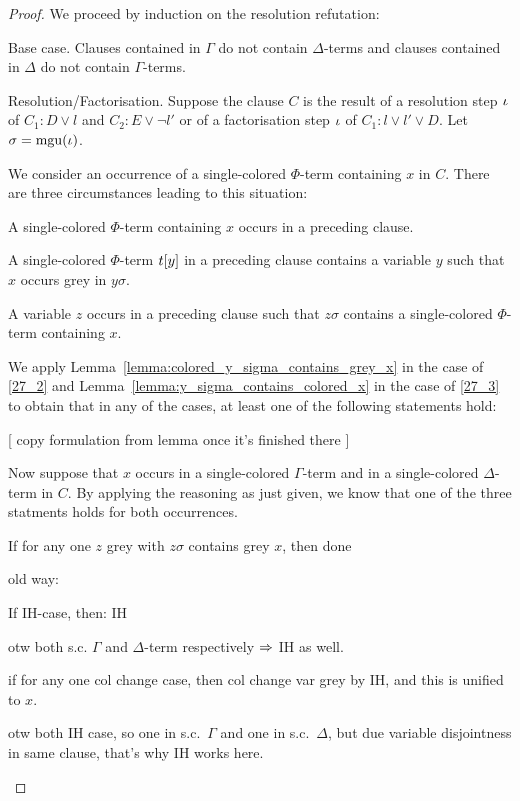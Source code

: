 \documentclass[,%
	draft=false,%
	numbers=noendperiod
	11pt,
	a4paper,
	oneside,%
	openany,
]{memoir}
\begin{document}
\begin{proof}
	We proceed by induction on the resolution refutation:

	\begin{description}
		\item{}Base case.
			Clauses contained in $\Gamma$ do not contain $\Delta$-terms and clauses contained in $\Delta$ do not contain $\Gamma$-terms.

		\item{}Resolution/Factorisation.
			Suppose the clause $C$ is the result of a resolution step $\iota$ of $C_1: D \lor l$ and $C_2: E \lor \lnot l'$
			or of a factorisation step $\iota$ of $C_1: l \lor l' \lor D$.
			Let $\sigma = \operatorname{mgu}(\iota)$. 


			We consider an occurrence of a single-colored $\Phi$-term containing $x$ in $C$.
			There are three circumstances leading to this situation:
			\begin{compactenum}
				\item A single-colored $\Phi$-term containing $x$ occurs in a preceding clause.
				\item A single-colored $\Phi$-term $t[y]$ in a preceding clause contains a variable $y$ such that $x$ occurs grey in $y\sigma$. \label{27_2}
				\item A variable $z$ occurs in a preceding clause such that $z\sigma$ contains a single-colored $\Phi$-term containing $x$. \label{27_3}
			\end{compactenum}

			We apply Lemma~\ref{lemma:colored_y_sigma_contains_grey_x} in the case of \ref{27_2} and
			Lemma~\ref{lemma:y_sigma_contains_colored_x} in the case of \ref{27_3} to obtain that in any of the cases, at least one of the following statements hold:

			[ copy formulation from lemma once it's finished there ]

			Now suppose that $x$ occurs in a single-colored $\Gamma$-term and in a single-colored $\Delta$-term in $C$.
			By applying the reasoning as just given, we know that one of the three statments holds for both occurrences. 

			If for any one $z$ grey with $z\sigma$ contains grey $x$, then done

			{ \tiny

				old way: 

				If IH-case, then: IH

				otw both s.c. $\Gamma$ and $\Delta$-term respectively $\Rightarrow$ IH as well.

			}

			if for any one col change case, then col change var grey by IH, and this is unified to $x$.

			otw both IH case, so one in s.c.\ $\Gamma$ and one in s.c.\ $\Delta$, but due variable disjointness in same clause, that's why IH works here.
			\qedhere

	\end{description}
\end{proof}
\end{document}
